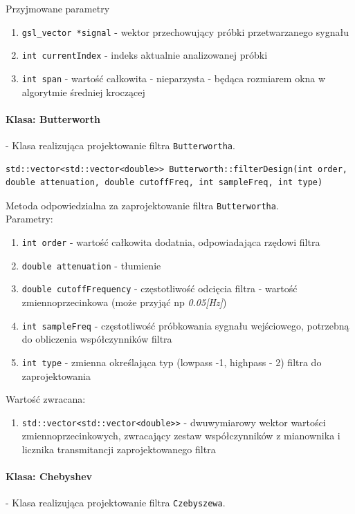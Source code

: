 \documentclass[a4paper, 11pt]{article}
\begin{document}
Przyjmowane parametry
\begin{enumerate}
\item \verb|gsl_vector *signal| - wektor przechowujący próbki przetwarzanego sygnału
\item \verb|int currentIndex| - indeks aktualnie analizowanej próbki
\item \verb|int span| - wartość całkowita - nieparzysta - będąca rozmiarem okna w algorytmie średniej kroczącej
\end{enumerate}

\paragraph{Klasa: Butterworth}
- Klasa realizująca projektowanie filtra \verb|Butterwortha|.

\begin{lstlisting}
std::vector<std::vector<double>> Butterworth::filterDesign(int order, 
double attenuation, double cutoffFreq, int sampleFreq, int type)
\end{lstlisting}
Metoda odpowiedzialna za zaprojektowanie filtra \verb|Butterwortha|.\\

Parametry:
\begin{enumerate}
\item \verb|int order| - wartość całkowita dodatnia, odpowiadająca rzędowi filtra
\item \verb|double attenuation| - tłumienie 
\item \verb|double cutoffFrequency| - częstotliwość odcięcia filtra - wartość zmiennoprzecinkowa (może przyjąć np \textit{0.05[Hz]})
\item \verb|int sampleFreq| - częstotliwość próbkowania sygnału wejściowego, potrzebną do obliczenia współczynników filtra
\item \verb|int type| - zmienna określająca typ (lowpass -1, highpass - 2) filtra do zaprojektowania
\end{enumerate}
Wartość zwracana:
\begin{enumerate}
\item \verb|std::vector<std::vector<double>>| - dwuwymiarowy wektor wartości zmiennoprzecinkowych, zwracający zestaw współczynników z mianownika i licznika transmitancji zaprojektowanego filtra
\end{enumerate}

\paragraph{Klasa: Chebyshev}
- Klasa realizująca projektowanie filtra \verb|Czebyszewa|.\\
\end{document}
